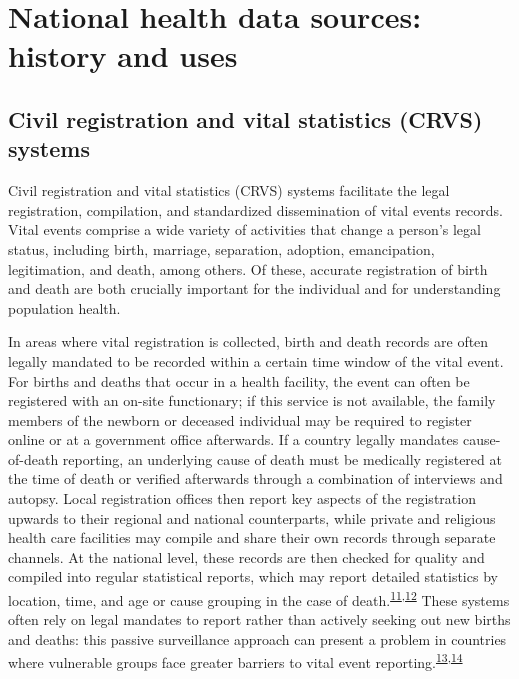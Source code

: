 \documentclass[
]{article}
\begin{document}
\hypertarget{national-health-data-sources-history-and-uses}{%
\section{National health data sources: history and uses}\label{national-health-data-sources-history-and-uses}}

\hypertarget{civil-registration-and-vital-statistics-crvs-systems}{%
\subsection{Civil registration and vital statistics (CRVS) systems}\label{civil-registration-and-vital-statistics-crvs-systems}}

Civil registration and vital statistics (CRVS) systems facilitate the legal registration, compilation, and standardized dissemination of vital events records. Vital events comprise a wide variety of activities that change a person's legal status, including birth, marriage, separation, adoption, emancipation, legitimation, and death, among others. Of these, accurate registration of birth and death are both crucially important for the individual and for understanding population health.

In areas where vital registration is collected, birth and death records are often legally mandated to be recorded within a certain time window of the vital event. For births and deaths that occur in a health facility, the event can often be registered with an on-site functionary; if this service is not available, the family members of the newborn or deceased individual may be required to register online or at a government office afterwards. If a country legally mandates cause-of-death reporting, an underlying cause of death must be medically registered at the time of death or verified afterwards through a combination of interviews and autopsy. Local registration offices then report key aspects of the registration upwards to their regional and national counterparts, while private and religious health care facilities may compile and share their own records through separate channels. At the national level, these records are then checked for quality and compiled into regular statistical reports, which may report detailed statistics by location, time, and age or cause grouping in the case of death.\textsuperscript{\protect\hyperlink{ref-Setel2007}{11},\protect\hyperlink{ref-UnitedNationsStatisticsDivision2014}{12}} These systems often rely on legal mandates to report rather than actively seeking out new births and deaths: this passive surveillance approach can present a problem in countries where vulnerable groups face greater barriers to vital event reporting.\textsuperscript{\protect\hyperlink{ref-Fisker2019}{13},\protect\hyperlink{ref-Hernandez2012}{14}}
\end{document}
